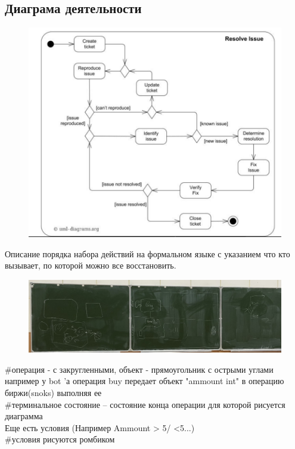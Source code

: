 \documentclass[12pt; a4paper]{book}
\begin{document}
\subsection{Диаграма деятельности}
\begin{figure}[!htbp]
\includegraphics[angle=0, width=\textwidth]{IMG/5} \\
\end{figure}

Описание порядка набора действий на формальном языке с указанием что кто вызывает, по которой можно все восстановить. \\
\begin{figure}[!htbp]
\includegraphics[angle=0, width=\textwidth]{IMG/IMG_0823.jpg} \\
\end{figure}

\#операция - с закругленными, объект - прямоугольник с острыми углами \\
например у bot 'а операция buy передает объект "ammount int" в операцию биржи(snoks) выполняя ее\\
\#терминальное состояние -- состояние конца операции для которой рисуется диаграмма \\
Еще есть условия (Например Ammount > 5/ <5...) \\
\#условия рисуются ромбиком\\\
\end{document}
